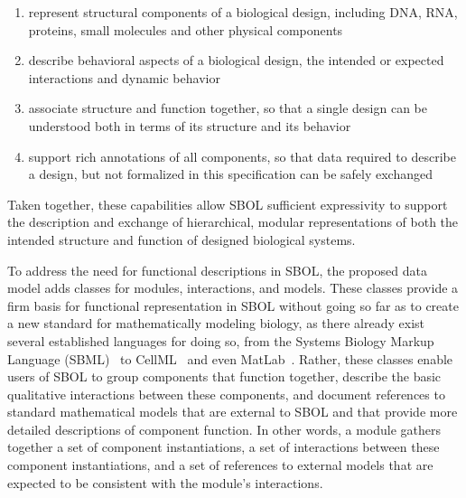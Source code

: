 \begin{enumerate}

\item represent structural components of a biological design, including DNA, RNA, proteins, small molecules and other physical components

\item describe behavioral aspects of a biological design, the intended or expected interactions and dynamic behavior

\item associate structure and function together, so that a single design can be understood both in terms of its structure and its behavior

\item support rich annotations of all components, so that data required to describe a design, but not formalized in this specification can be safely exchanged

\end{enumerate}

Taken together, these capabilities allow SBOL sufficient expressivity to support the description and exchange of hierarchical, modular representations of both the intended structure and function of designed biological systems.

To address the need for functional descriptions in SBOL, the proposed data model adds classes for modules, interactions, and models. These classes provide a firm basis for functional representation in SBOL without going so far as to create a new standard for mathematically modeling biology, as there already exist several established languages for doing so, from the Systems Biology Markup Language (SBML)~\cite{SBML} to CellML~\cite{CellML} and even MatLab~\cite{matlab}. Rather, these classes enable users of SBOL to group components that function together, describe the basic qualitative interactions between these components, and document references to standard mathematical models that are external to SBOL and that provide more detailed descriptions of component function. In other words, a module gathers together a set of component instantiations, a set of interactions between these component instantiations, and a set of references to external models that are expected to be consistent with the module's interactions.

